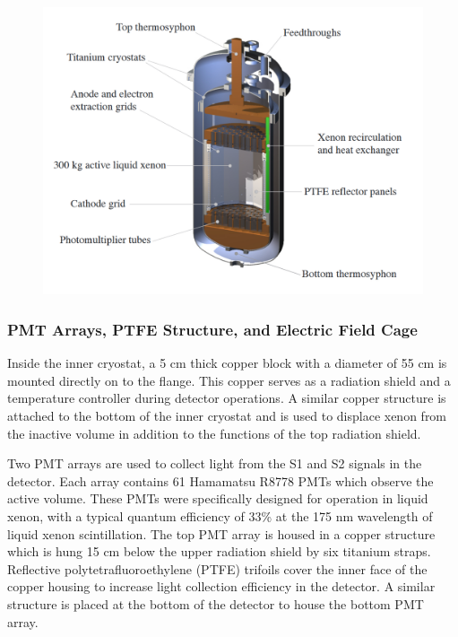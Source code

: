 \documentclass[a4paper,12pt]{article}
\begin{document}
 \begin{figure} 
\includegraphics[scale=.45]{LuxCryostat.png} 
\label{LuxCross}
\end{figure}

	
\subsubsection{PMT Arrays, PTFE Structure, and Electric Field Cage}
Inside the inner cryostat, a 5 cm thick copper block with a diameter of 55 cm is mounted directly on to the flange.  This copper serves as a radiation shield and a temperature controller during detector operations. A similar copper structure is attached to the bottom of the inner cryostat and is used to displace xenon from the inactive volume in addition to the functions of the top radiation shield.  

Two PMT arrays are used to collect light from the S1 and S2 signals in the detector.  Each array contains 61 Hamamatsu R8778 PMTs which observe the active volume.  These PMTs were specifically designed for operation in liquid xenon, with a typical quantum efficiency of 33\% at the 175 nm wavelength of liquid xenon scintillation.  The top PMT array is housed in a copper structure which is hung 15 cm below the upper radiation shield by six titanium straps.  Reflective polytetrafluoroethylene (PTFE)   trifoils cover the inner face of the copper housing to increase light collection efficiency in the detector.  A similar structure is placed at the bottom of the detector to house the bottom PMT array. 
\end{document}
